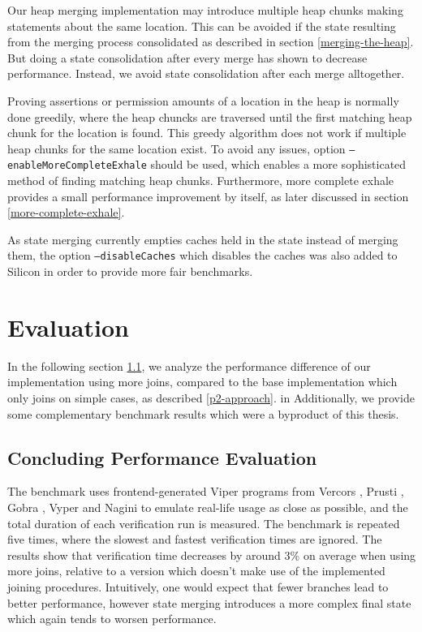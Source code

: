 \documentclass[11pt]{article}
\begin{document}
    Our heap merging implementation may
    introduce multiple heap chunks making statements about the same location. This can be
    avoided if the state resulting from the merging process consolidated as
    described in section \ref{merging-the-heap}. But doing a state consolidation
    after every merge has shown to decrease performance.
    Instead, we avoid state consolidation after each merge alltogether.

    Proving assertions or permission amounts of a location in the heap
    is normally done greedily, where the heap chuncks are
    traversed until the first matching heap chunk for the location is found.
    This greedy algorithm does not work if multiple heap chunks for the same location
    exist. To avoid any issues,
    option \texttt{--enableMoreCompleteExhale} should be used,
    which enables a more sophisticated method of finding matching heap chunks.
    Furthermore, more complete exhale provides a small performance improvement
    by itself, as later discussed in section \ref{more-complete-exhale}.

    As state merging currently empties caches held in the state
    instead of merging them, the option
    \texttt{--disableCaches} which disables the caches
    was also added to Silicon in order to provide more fair benchmarks.

    \newpage
    \section{Evaluation}

    In the following section \ref{concluding-performance-evaluation}, we analyze the performance difference
    of our implementation using more joins, compared to the base implementation
    which only joins on simple cases, as described \ref{p2-approach}. in Additionally, we provide some complementary benchmark results
    which were a byproduct of this thesis. 


    \subsection{Concluding Performance Evaluation} \label{concluding-performance-evaluation}
    
    The benchmark uses frontend-generated Viper programs from Vercors \cite{vercors},
    Prusti \cite{prusti}, Gobra \cite{gobra}, Vyper \cite{vyper} and Nagini \cite{nagini}
    to emulate real-life usage as close as possible, and
    the total duration of each verification run is measured.
    The benchmark is repeated five times, where the
    slowest and fastest verification times are ignored.
    The results show that verification time
    decreases by around 3\% on average when using more joins,
    relative to a version which doesn't
    make use of the implemented joining procedures.
    Intuitively, one would expect that fewer branches lead to better
    performance, however state merging introduces a more complex final state which again tends to worsen
    performance.
    
\end{document}
